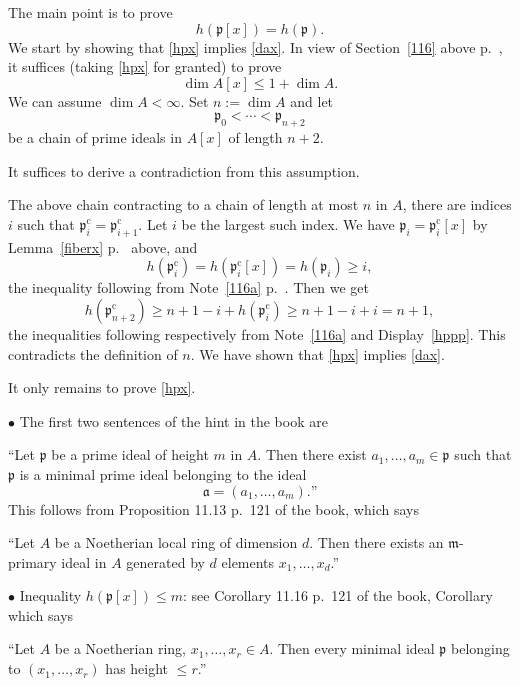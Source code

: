 \documentclass[parskip=half,fontsize=12pt]{scrartcl}%
\newcommand{\oo}{\operatorname}\newcommand{\ooo}{\operatorname*}
\newcommand{\mf}{\mathfrak}
\newcommand{\aaa}{\mf a}
\newcommand{\mmm}{\mf m}
\newcommand{\ppp}{\mf p}
\begin{document}
The main point is to prove 
\begin{equation}\label{hpx}
h(\ppp[x])=h(\ppp).
\end{equation}
We start by showing that \eqref{hpx} implies \eqref{dax}. In view of Section~\ref{116} above p.~\pageref{116}, it suffices (taking \eqref{hpx} for granted) to prove 
$$
\dim A[x]\le1+\dim A.
$$ 
We can assume $\dim A<\infty$. Set $n:=\dim A$ and let 
$$ 
\ppp_0<\cdots<\ppp_{n+2}
$$ 
be a chain of prime ideals in $A[x]$ of length $n+2$. 

It suffices to derive a contradiction from this assumption. 

The above chain contracting to a chain of length at most $n$ in $A$, there are indices $i$ such that $\ppp_i^{\oo c}=\ppp_{i+1}^{\oo c}$. Let $i$ be the largest such index. We have $\ppp_i=\ppp_i^{\oo c}[x]$ %
by Lemma~\ref{fiberx} p.~\pageref{fiberx} above, %
and 
\begin{equation}\label{hppp}
h(\ppp_i^{\oo c})=h(\ppp_i^{\oo c}[x])=h(\ppp_i)\ge i,
\end{equation}
the inequality following from Note~\ref{116a} p.~\pageref{116a}. %
Then we get 
$$
h(\ppp_{n+2}^{\oo c})\ge n+1-i+h(\ppp_i^{\oo c})\ge n+1-i+i=n+1,
$$ 
the inequalities following respectively from Note~\ref{116a} and Display~\eqref{hppp}. This contradicts the definition of $n$. We have shown that \eqref{hpx} implies \eqref{dax}. 

It only remains to prove \eqref{hpx}.

$\bullet$ The first two sentences of the hint in the book are 

``Let $\ppp$ be a prime ideal of height $m$ in $A$. Then there exist $a_1,\ldots,a_m\in\ppp$ such that $\ppp$ is a minimal prime ideal belonging to the ideal 
$$
\aaa=(a_1,\ldots,a_m).\text{''}
$$ 
This follows from Proposition 11.13 p.~121 of the book, which says 

``Let $A$ be a Noetherian local ring of dimension $d$. Then there exists an $\mmm$-primary ideal in $A$ generated by $d$ elements $x_1,\ldots,x_d$.'' %

$\bullet$ Inequality $h(\ppp[x])\le m$: see Corollary 11.16 p.~121 of the book, Corollary which says 

``Let $A$ be a Noetherian ring, $x_1,\ldots,x_r\in A$. Then every minimal ideal $\ppp$ belonging to $(x_1,\ldots,x_r)$ has height $\le r$.''
\end{document}
